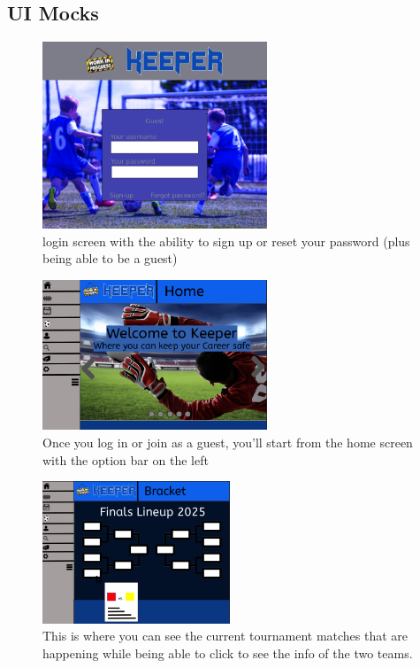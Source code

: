 \documentclass{article}
\begin{document}
\subsection{UI Mocks}
\begin{figure}[h]
    \centering
    \includegraphics[width=0.6\textwidth]{images/Loginscreen .png}
    \caption{login screen with the ability to sign up or reset your password (plus being able to be a guest)}
\end{figure}

\begin{figure}[h]
    \centering
    \includegraphics[width=0.6\textwidth]{images/Homescreen.png}
    \caption{Once you log in or join as a guest, you'll start from the home screen with the option bar on the left}
\end{figure}

\begin{figure}[]
    \centering
    \includegraphics[width=0.5\textwidth]{images/Bracket.png}
    \caption{This is where you can see the current tournament matches that are happening while being able to click to see the info of the two teams.}
\end{figure}
\end{document}
